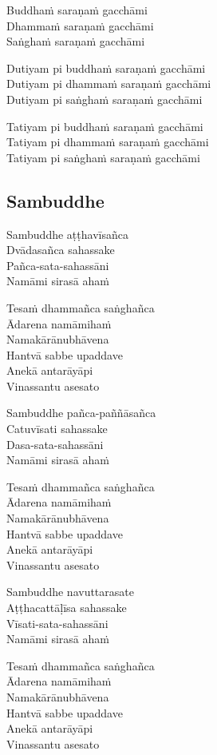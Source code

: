 \begin{paritta}
Buddhaṁ saraṇaṁ gacchāmi\\
Dhammaṁ saraṇaṁ gacchāmi\\
Saṅghaṁ saraṇaṁ gacchāmi

Dutiyam pi buddhaṁ saraṇaṁ gacchāmi\\
Dutiyam pi dhammaṁ saraṇaṁ gacchāmi\\
Dutiyam pi saṅghaṁ saraṇaṁ gacchāmi

Tatiyam pi buddhaṁ saraṇaṁ gacchāmi\\
Tatiyam pi dhammaṁ saraṇaṁ gacchāmi\\
Tatiyam pi saṅghaṁ saraṇaṁ gacchāmi
\end{paritta}

\subsection{Sambuddhe}
\label{sambuddhe}


\begin{paritta}
Sambuddhe aṭṭhavīsañca\\
Dvādasañca sahassake\\
Pañca-sata-sahassāni\\
Namāmi sirasā ahaṁ

Tesaṁ dhammañca saṅghañca\\
Ādarena namāmihaṁ\\
Namakārānubhāvena\\
Hantvā sabbe upaddave\\
Anekā antarāyāpi\\
Vinassantu asesato

Sambuddhe pañca-paññāsañca\\
Catuvīsati sahassake\\
Dasa-sata-sahassāni\\
Namāmi sirasā ahaṁ

Tesaṁ dhammañca saṅghañca\\
Ādarena namāmihaṁ\\
Namakārānubhāvena\\
Hantvā sabbe upaddave\\
Anekā antarāyāpi\\
Vinassantu asesato

Sambuddhe navuttarasate\\
Aṭṭhacattāḷīsa sahassake\\
Vīsati-sata-sahassāni\\
Namāmi sirasā ahaṁ

Tesaṁ dhammañca saṅghañca\\
Ādarena namāmihaṁ\\
Namakārānubhāvena\\
Hantvā sabbe upaddave\\
Anekā antarāyāpi\\
Vinassantu asesato
\end{paritta}

